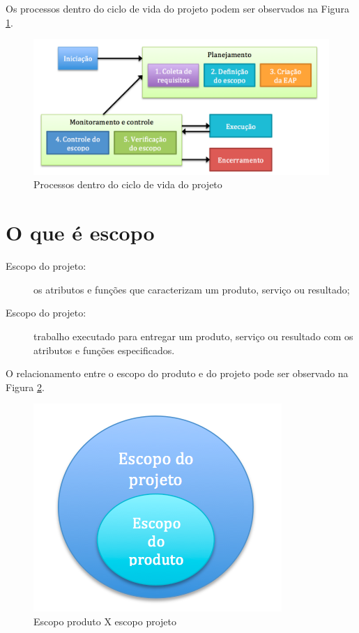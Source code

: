 Os processos dentro do ciclo de vida do projeto podem ser observados na Figura \ref{fig:ciclo:vida}.

\begin{figure}[!h]
	\centering
	\includegraphics[scale=0.5]{Figuras/ciclo_vida.png}
	\caption{Processos dentro do ciclo de vida do projeto}
	\label{fig:ciclo:vida}
\end{figure}

\section{O que é escopo}

\begin{description}
	
	\item[Escopo do projeto:] os atributos e funções que caracterizam um produto, serviço ou resultado;
	
	\item[Escopo do projeto:] trabalho executado para entregar um produto, serviço ou resultado com os atributos e funções especificados.
	
\end{description}

O relacionamento entre o escopo do produto e do projeto pode ser observado na Figura \ref{fig:escopo:proj:prod}.

\begin{figure}[!h]
\centering
\includegraphics[scale=0.5]{Figuras/escopo_proj_prod.png}
\caption{Escopo produto X escopo projeto}
\label{fig:escopo:proj:prod}
\end{figure}

